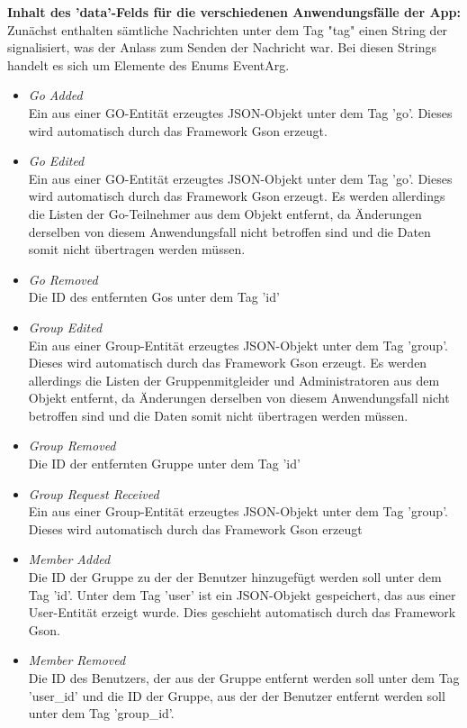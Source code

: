 \textbf{Inhalt des 'data'-Felds für die verschiedenen Anwendungsfälle der App:}
Zunächst enthalten sämtliche Nachrichten unter dem Tag "tag" einen String der signalisiert, was der Anlass zum Senden der Nachricht war. Bei diesen Strings handelt es sich um Elemente des Enums EventArg.
\begin{itemize}
	\item \textit{Go Added}\\
	Ein aus einer GO-Entität erzeugtes JSON-Objekt unter dem Tag 'go'. Dieses wird automatisch durch das Framework Gson erzeugt.
	\item \textit{Go Edited}\\
	Ein aus einer GO-Entität erzeugtes JSON-Objekt unter dem Tag 'go'. Dieses wird automatisch durch das Framework Gson erzeugt. Es werden allerdings die Listen der Go-Teilnehmer aus dem Objekt entfernt,
	da Änderungen derselben von diesem Anwendungsfall nicht betroffen sind und die Daten somit nicht übertragen werden müssen.
	\item \textit{Go Removed}\\
	Die ID des entfernten Gos unter dem Tag 'id'
	\item \textit{Group Edited}\\
	Ein aus einer Group-Entität erzeugtes JSON-Objekt unter dem Tag 'group'. Dieses wird automatisch durch das Framework Gson erzeugt. Es werden allerdings die Listen der Gruppenmitgleider und Administratoren aus dem Objekt entfernt, da Änderungen derselben von diesem Anwendungsfall nicht betroffen sind und die Daten somit nicht übertragen werden müssen.
	\item \textit{Group Removed}\\
	Die ID der entfernten Gruppe unter dem Tag 'id'
	\item \textit{Group Request Received}\\
	Ein aus einer Group-Entität erzeugtes JSON-Objekt unter dem Tag 'group'. Dieses wird automatisch durch das Framework Gson erzeugt
	\item \textit{Member Added}\\
	Die ID der Gruppe zu der der Benutzer hinzugefügt werden soll unter dem Tag 'id'. Unter dem Tag 'user' ist ein JSON-Objekt gespeichert, das aus einer User-Entität erzeigt wurde. Dies geschieht automatisch durch das Framework Gson.
	\item \textit{Member Removed}\\
	Die ID des Benutzers, der aus der Gruppe entfernt werden soll unter dem Tag 'user\_id' und die ID der Gruppe, aus der der Benutzer entfernt werden soll unter dem Tag 'group\_id'.

\end{itemize}
